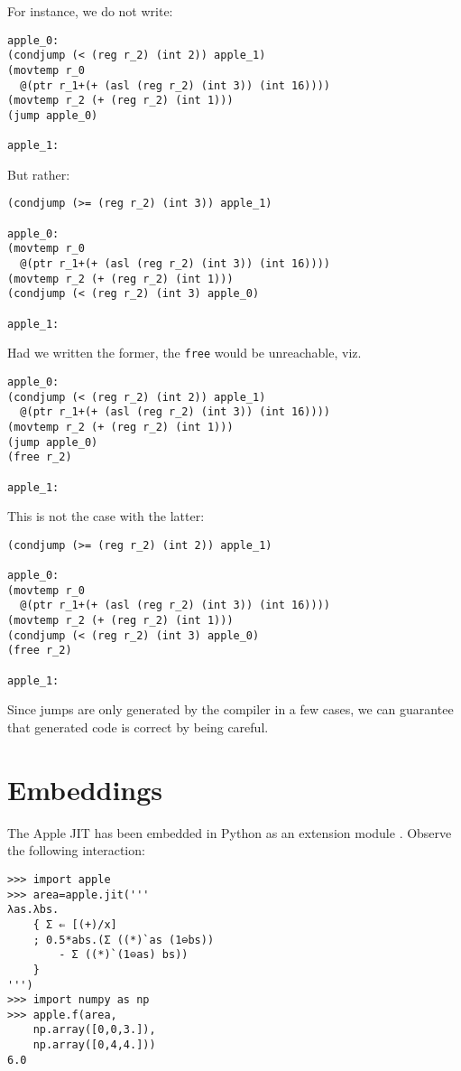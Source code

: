\documentclass[sigplan,screen,anonymous]{acmart}
\begin{document}
For instance, we do not write:

\begin{verbatim}
apple_0:
(condjump (< (reg r_2) (int 2)) apple_1)
(movtemp r_0
  @(ptr r_1+(+ (asl (reg r_2) (int 3)) (int 16))))
(movtemp r_2 (+ (reg r_2) (int 1)))
(jump apple_0)

apple_1:
\end{verbatim}

But rather:

\begin{verbatim}
(condjump (>= (reg r_2) (int 3)) apple_1)

apple_0:
(movtemp r_0
  @(ptr r_1+(+ (asl (reg r_2) (int 3)) (int 16))))
(movtemp r_2 (+ (reg r_2) (int 1)))
(condjump (< (reg r_2) (int 3) apple_0)

apple_1:
\end{verbatim}

Had we written the former, the {\tt free} would be unreachable, viz.

\begin{verbatim}
apple_0:
(condjump (< (reg r_2) (int 2)) apple_1)
  @(ptr r_1+(+ (asl (reg r_2) (int 3)) (int 16))))
(movtemp r_2 (+ (reg r_2) (int 1)))
(jump apple_0)
(free r_2)

apple_1:
\end{verbatim}

This is not the case with the latter:

\begin{verbatim}
(condjump (>= (reg r_2) (int 2)) apple_1)

apple_0:
(movtemp r_0
  @(ptr r_1+(+ (asl (reg r_2) (int 3)) (int 16))))
(movtemp r_2 (+ (reg r_2) (int 1)))
(condjump (< (reg r_2) (int 3) apple_0)
(free r_2)

apple_1:
\end{verbatim}

Since jumps are only generated by the compiler in a few cases, we can guarantee that generated code is correct by being careful.

\section{Embeddings}

The Apple JIT has been embedded in Python as an extension module \cite{pythonext}. Observe the following interaction:

\begin{verbatim}
>>> import apple
>>> area=apple.jit('''
λas.λbs.
    { Σ ⇐ [(+)/x]
    ; 0.5*abs.(Σ ((*)`as (1⊖bs))
        - Σ ((*)`(1⊖as) bs))
    }
''')
>>> import numpy as np
>>> apple.f(area,
    np.array([0,0,3.]),
    np.array([0,4,4.]))
6.0
\end{verbatim}
\end{document}
